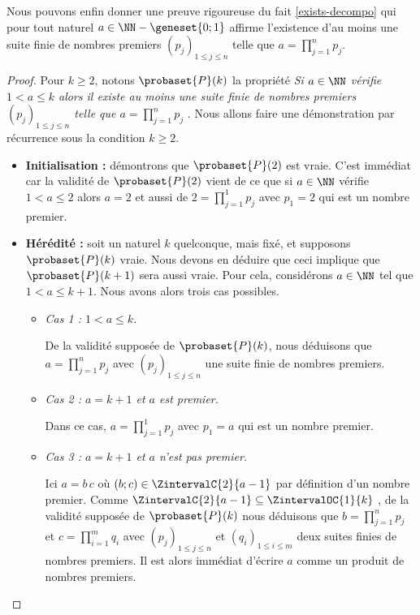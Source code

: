 Nous pouvons enfin donner une preuve rigoureuse du fait \ref{exists-decompo} qui pour tout naturel $a \in \NN - \geneset{0 ; 1}$ affirme l'existence d'au moins une suite finie de nombres premiers $(p_j)_{1 \leq j \leq n}$ telle que $\displaystyle a = \prod_{j=1}^{n} p_j$.


\begin{proof}
	Pour $k \geq 2$, notons $\probaset{P}(k)$ la propriété \emph{\og Si $a \in \NN$ vérifie $1 < a \leq k$ alors il existe au moins une suite finie de nombres premiers $(p_j)_{1 \leq j \leq n}$ telle que $\displaystyle a = \prod_{j=1}^{n} p_j$ \fg}. Nous allons faire une démonstration par récurrence sous la condition $k \geq 2$.
	
	\begin{itemize}[label=\small\textbullet]
		\medskip
		\item \textbf{Initialisation :} démontrons que $\probaset{P}(2)$ est vraie. C'est immédiat car la validité de $\probaset{P}(2)$ vient de ce que si $a \in \NN$ vérifie $1 < a \leq 2$ alors $a = 2$ et aussi de $\displaystyle 2 = \prod_{j=1}^{1} p_j$ avec $p_1 = 2$ qui est un nombre premier. 


		\medskip
		\item \textbf{Hérédité :} soit un naturel $k$ quelconque, mais fixé, et supposons $\probaset{P}(k)$ vraie. Nous devons en déduire que ceci implique que $\probaset{P}(k+1)$ sera aussi vraie.
		Pour cela, considérons $a \in \NN$ tel que $1 < a \leq k + 1$. Nous avons alors trois cas possibles.
		\begin{itemize}
			\smallskip
			\item \emph{Cas 1 : $1 < a \leq k$.}
			      
			      De la validité supposée de $\probaset{P}(k)$, nous déduisons que $\displaystyle a = \prod_{j=1}^{n} p_j$ avec $(p_j)_{1 \leq j \leq n}$ une suite finie de nombres premiers. 

			\smallskip
			\item \emph{Cas 2 : $a = k + 1$ et $a$ est premier.}
			      
			      Dans ce cas, $\displaystyle a = \prod_{j=1}^{1} p_j$ avec $p_1 = a$ qui est un nombre premier. 

			\smallskip
			\item \emph{Cas 3 : $a = k + 1$ et $a$ n'est pas premier.}
			      
			      Ici $a = b \, c$ où $(b ; c) \in \ZintervalC{2}{a-1}$ par définition d'un nombre premier.
			      Comme $\ZintervalC{2}{a-1} \subseteq \ZintervalOC{1}{k}$ , de la validité supposée de $\probaset{P}(k)$ nous déduisons que $\displaystyle b = \prod_{j=1}^{n} p_j$  et $\displaystyle c = \prod_{i=1}^{m} q_i$ avec $(p_j)_{1 \leq j \leq n}$ et $(q_i)_{1 \leq i \leq m}$ deux suites finies de nombres premiers. Il est alors immédiat d'écrire $a$ comme un produit de nombres premiers.
		\end{itemize}



\end{itemize}
\end{proof}
